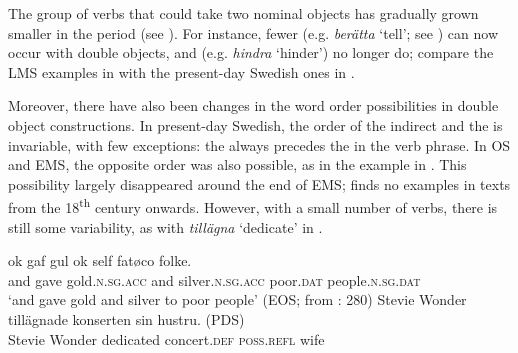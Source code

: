 \documentclass[output=paper]{langscibook}
\begin{document}
The group of verbs that could take two nominal objects has gradually grown smaller in the  period (see \citealt{Valdeson2017}). For instance, fewer  (e.g. \textit{berätta} ‘tell’; see \citealt{Silen2005}) can now occur with double objects, and  (e.g. \textit{hindra} ‘hinder’) no longer do; compare the LMS examples in  with the present-day Swedish ones in .


\ea\label{ex:intro:24}

\z
\ex \label{ex:intro:25}

\z
\z

Moreover, there have also been changes in the word order possibilities in double object constructions. In present-day Swedish, the order of the indirect and the  is invariable, with few exceptions: the  always precedes the  in the verb phrase. In OS and EMS, the opposite order was also possible, as in the example in . This possibility largely disappeared around the end of EMS; \citet{Valdeson2016} finds no examples in texts from the 18\textsuperscript{th} century onwards. However, with a small number of verbs, there is still some variability, as with \textit{tillägna} ‘dedicate’ in .


\ea\label{ex:intro:26}
\gll  ok   gaf   gul             ok   self           fatøco     folke. \\
  and gave   gold\textsc{.n.sg.acc}   and  silver\textsc{.n.sg.acc}   poor\textsc{.dat}   people\textsc{.n.sg.dat}\\
    \glt `and gave gold and silver to poor people’ (EOS; from \citealt{Valdeson2016}: 280)
\ex\label{ex:intro:27}
\ea
\gll  Stevie Wonder   tillägnade konserten     sin         hustru. (PDS)\\
Stevie Wonder  dedicated  concert.\textsc{def}     \textsc{poss.refl}  wife  \\
\end{document}
